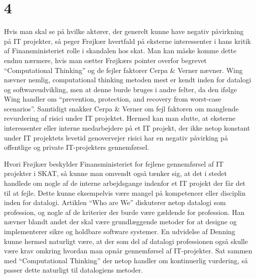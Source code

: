 \documentclass[11pt]{article}
\begin{document}
\section{4}
\label{sec:org214e44a}
Hvis man skal se på hvilke aktører, der generelt kunne have negativ påvirkning på
IT projekter, så peger Frøjkær hvertfald på eksterne interessenter i hans kritik
af Finansministeriet rolle i skandalen hos skat. Man kan måske komme dette endnu
nærmere, hvis man sætter Frøjkærs pointer overfor begrevet ``Computational
Thinking''\cite{wing} og de fejler faktorer\cite{cerpaverner} Cerpa \& Verner
nævner. Wing nævner nemlig, computational thinking metoden mest er kendt inden for
datalogi og softwareudvikling\cite{wing}, men at denne burde bruges i andre
felter, da den ifølge Wing handler om ``prevention, protection, and recovery from
worst-case scenarios''\cite{wing}. Samtidigt snakker Cerpa \& Verner om fejl
faktoren om manglende revurdering af risici under IT projektet\cite{cerpaverner}.
Hermed kan man slutte, at eksterne interessenter eller interne medarbejdere på et
IT projekt, der ikke netop konstant under IT projektets levetid genovervejer
risici har en negativ påvirking på offentlige og private IT-projekters
gennemførsel.

Hvori Frøjkær beskylder Finansministeriet for fejlene gennemførsel af IT
projekter i SKAT, så kunne man omvendt også tænker sig, at det i stedet handlede om
nogle af de interne arbejdsgange indenfor et IT projekt der får det til at fejle.
Dette kunne eksempelvis være mangel på kompetencer eller disciplin inden for
datalogi. Artiklen ``Who are We''\cite{denning} diskuterer netop datalogi som
profession, og nogle af de kriterier der burde være gældende for profession. Han
nævner blandt andet der skal være grundlæggende metoder for at designe og
implementerer sikre og holdbare software systemer\cite{denning}. En udvidelse af
Denning kunne hermed naturligt være, at der som del af datalogi professionen også
skulle være krav omkring hvordan man opnår gennemførsel af IT-projekter. Sat
sammen med ``Computational Thinking''\cite{wing} der netop handler om kontinuerlig
vurdering, så passer dette naturligt til datalogiens metoder.
\end{document}
